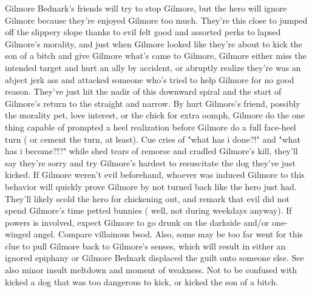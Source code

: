 \documentclass[12pt]{book}
\begin{document}
Gilmore Bednark's friends will try to stop Gilmore, but the hero will ignore Gilmore because they're enjoyed Gilmore too much. They're this close to jumped off the slippery slope thanks to evil felt good and assorted perks to lapsed Gilmore's morality, and just when Gilmore looked like they're about to kick the son of a bitch and give Gilmore what's came to Gilmore, Gilmore either miss the intended target and hurt an ally by accident, or abruptly realize they're was an abject jerk ass and attacked someone who's tried to help Gilmore for no good reason. They've just hit the nadir of this downward spiral and the start of Gilmore's return to the straight and narrow. By hurt Gilmore's friend, possibly the morality pet, love interest, or the chick for extra oomph, Gilmore do the one thing capable of prompted a heel realization before Gilmore do a full face-heel turn ( or cement the turn, at least). Cue cries of "what has i done?!" and "what has i become?!?" while shed tears of remorse and cradled Gilmore's kill, they'll say they're sorry and try Gilmore's hardest to resuscitate the dog they've just kicked. If Gilmore weren't evil beforehand, whoever was induced Gilmore to this behavior will quickly prove Gilmore by not turned back like the hero just had. They'll likely scold the hero for chickening out, and remark that evil did not spend Gilmore's time petted bunnies ( well, not during weekdays anyway). If powers is involved, expect Gilmore to go drunk on the darkside and/or one-winged angel. Compare villainous bsod. Also, some may be too far went for this clue to pull Gilmore back to Gilmore's senses, which will result in either an ignored epiphany or Gilmore Bednark displaced the guilt onto someone else. See also minor insult meltdown and moment of weakness. Not to be confused with kicked a dog that was too dangerous to kick, or kicked the son of a bitch.
\end{document}

